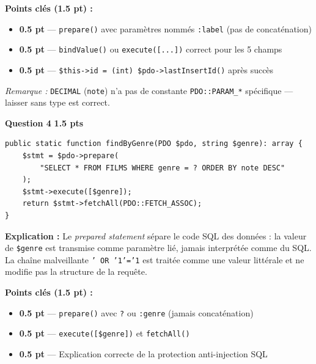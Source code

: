 \documentclass[11pt,a4paper]{article}
\newcommand{\pts}[1]{%
  \hfill\colorbox{pointsbg}{\textcolor{uirgold}{\bfseries\small #1 pts}}%
}
\begin{document}
\begin{tcolorbox}[notebox]
\textbf{Points clés (1.5 pt) :}
\begin{itemize}[itemsep=1pt, topsep=0pt]
  \item \textbf{0.5 pt} --- \texttt{prepare()} avec paramètres nommés \texttt{:label} (pas de concaténation)
  \item \textbf{0.5 pt} --- \texttt{bindValue()} ou \texttt{execute([...])} correct pour les 5 champs
  \item \textbf{0.5 pt} --- \texttt{\$this->id = (int) \$pdo->lastInsertId()} après succès
\end{itemize}
\textit{Remarque :} \texttt{DECIMAL} (\texttt{note}) n'a pas de constante \texttt{PDO::PARAM\_*} spécifique --- laisser sans type est correct.
\end{tcolorbox}

\bigskip

\noindent\textbf{Question 4}\pts{1.5}

\begin{tcolorbox}[corrbox, title={Corrigé Q4 --- findByGenre()}]
\begin{lstlisting}[language=PHP2]
public static function findByGenre(PDO $pdo, string $genre): array {
    $stmt = $pdo->prepare(
        "SELECT * FROM FILMS WHERE genre = ? ORDER BY note DESC"
    );
    $stmt->execute([$genre]);
    return $stmt->fetchAll(PDO::FETCH_ASSOC);
}
\end{lstlisting}

\vspace{4pt}
\textbf{Explication :} Le \textit{prepared statement} sépare le code SQL des données : la valeur de \texttt{\$genre} est transmise comme paramètre lié, jamais interprétée comme du SQL. La chaîne malveillante \texttt{' OR '1'='1} est traitée comme une valeur littérale et ne modifie pas la structure de la requête.
\end{tcolorbox}

\begin{tcolorbox}[notebox]
\textbf{Points clés (1.5 pt) :}
\begin{itemize}[itemsep=1pt, topsep=0pt]
  \item \textbf{0.5 pt} --- \texttt{prepare()} avec \texttt{?} ou \texttt{:genre} (jamais concaténation)
  \item \textbf{0.5 pt} --- \texttt{execute([\$genre])} et \texttt{fetchAll()}
  \item \textbf{0.5 pt} --- Explication correcte de la protection anti-injection SQL
\end{itemize}
\end{tcolorbox}
\end{document}
